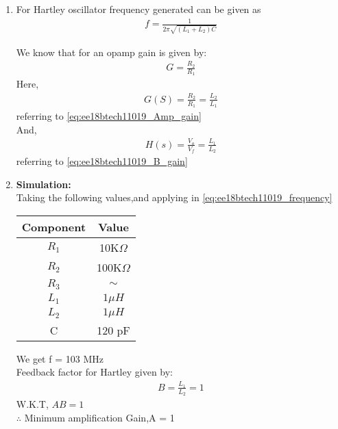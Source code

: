 \begin{enumerate}[label=\thesection.\arabic*.,ref=\thesection.\theenumi]
\item For Hartley oscillator frequency generated can be given as 
\begin{align}
    f = \frac{1}{2\pi\sqrt{(L_1 + L_2)C}}
    \label{eq:ee18btech11019_frequency}
\end{align}

We know that for an opamp gain is given by:
\begin{align}
    G = \frac{R_2}{R_1}
\end{align}
Here,
\begin{align}
    G(S) = \frac{R_2}{R_1} = \frac{L_2}{L_1}
\end{align}
referring to \ref{eq:ee18btech11019_Amp_gain}\\
And,
\begin{align}
    H(s) = \frac{V_o}{V_f} = \frac{L_1}{L_2}
\end{align}
referring to \ref{eq:ee18btech11019_B_gain}\\
\newline
\item \textbf{Simulation:}\\
Taking the following values,and applying in \ref{eq:ee18btech11019_frequency} \\



\begin{tabular}{|c|c|}
\hline
Component & Value  \\
\hline
$R_1$         & 10K$\Omega$   \\
\hline
$R_2$         & 100K$\Omega$   \\
\hline
$R_3$         & $\sim$  \\
\hline
$L_1$         & $1 \mu H$     \\
\hline
$L_2$         & $1 \mu H$   \\
\hline
C         & 120 pF \\
\hline
\end{tabular}


We get f = 103 MHz\\
Feedback factor for Hartley given by:
\begin{align}
B =\frac{L_1}{L_2}= 1
\end{align}
W.K.T, $AB = 1$\\
$\therefore$ Minimum amplification Gain,A = 1\\
\end{enumerate}
